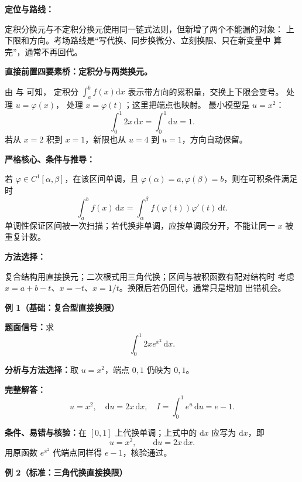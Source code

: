 \par

\begin{knowledgeBox}
\textbf{定位与路线：}

定积分换元与不定积分换元使用同一链式法则，但新增了两个不能漏的对象：
上下限和方向。考场路线是“写代换、同步换微分、立刻换限、只在新变量中
算完”，通常不再回代。

\textbf{直接前置四要素桥：定积分与两类换元。}

由 与
可知，
定积分 \(\int_a^b f(x)\mathrm dx\) 表示带方向的累积量，交换上下限会变号。
处理
\(u=\varphi(x)\)，
处理
\(x=\varphi(t)\)；这里把端点也映射。
最小模型是 \(u=x^2\)：
\[
\int_0^1 2x\,\mathrm dx=\int_0^1\mathrm du=1.
\]
若从 \(x=2\) 积到 \(x=1\)，新限也从 \(u=4\) 到 \(u=1\)，方向自动保留。

\textbf{严格核心、条件与推导：}

若 \(\varphi\in C^1[\alpha,\beta]\)，在该区间单调，且
\(\varphi(\alpha)=a,\varphi(\beta)=b\)，则在可积条件满足时
\[
\boxed{\int_a^b f(x)\,\mathrm dx
=\int_\alpha^\beta f(\varphi(t))\varphi'(t)\,\mathrm dt.}
\]
单调性保证区间被一次扫描；若代换非单调，应按单调段分开，不能让同一
\(x\) 被重复计数。

\textbf{方法选择：}

复合结构用直接换元；二次根式用三角代换；区间与被积函数有配对结构时
考虑 \(x=a+b-t\)、\(x=-t\)、\(x=1/t\)。换限后若仍回代，通常只是增加
出错机会。

\textbf{例 1（基础：复合型直接换限）}

\textbf{题面信号：}求
\[
\int_0^1 2x e^{x^2}\,\mathrm dx.
\]

\textbf{分析与方法选择：}取 \(u=x^2\)，端点 \(0,1\) 仍映为 \(0,1\)。

\textbf{完整解答：}
\[
u=x^2,\quad\mathrm du=2x\,\mathrm dx,\quad
I=\int_0^1e^u\,\mathrm du=e-1.
\]

\textbf{条件、易错与核验：}在 \([0,1]\) 上代换单调；上式中的
\(\mathrm dx\) 应写为 \(\mathrm dx\)，即
\[
u=x^2,\qquad\mathrm du=2x\,\mathrm dx.
\]
用原函数 \(e^{x^2}\) 代端点同样得 \(e-1\)，核验通过。

\textbf{例 2（标准：三角代换直接换限）}


\end{knowledgeBox}
